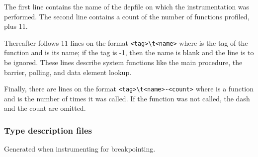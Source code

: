The first line contains the name of the depfile on which the
instrumentation was performed. The second line contains a count of the
number of functions profiled, plus 11.

Thereafter follows 11 lines on the format \verb+<tag>\t<name>+ where
 is the tag of the function and  is its name;
if the tag is -1, then the name is blank and the line is to be
ignored. These lines describe system functions like the main procedure, the
barrier, polling, and data element lookup. 

Finally, there are lines on the format \verb+<tag>\t<name>-<count>+
where  is a function and  is the number of
times it was called. If the function was not called, the dash and the
count are omitted.

\subsubsection{Type description files}

Generated when instrumenting for breakpointing.





